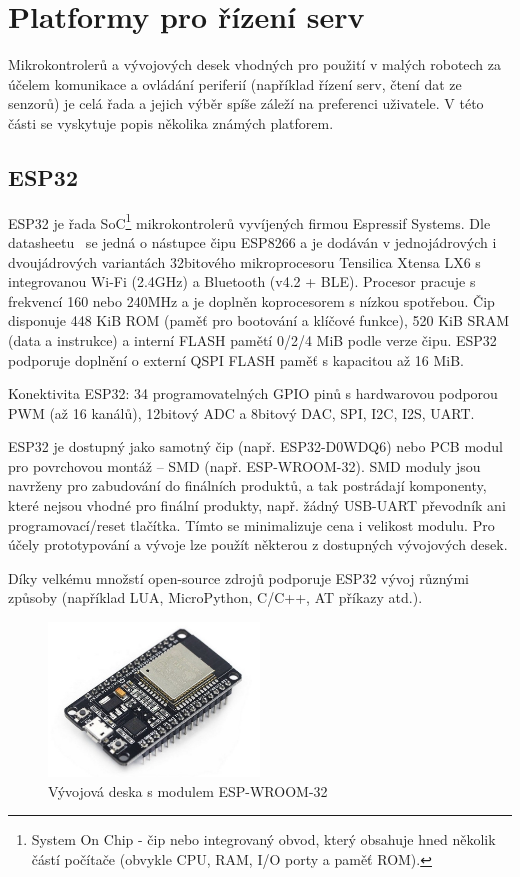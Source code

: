 \section{Platformy pro řízení serv}
Mikrokontrolerů a vývojových desek vhodných pro použití v malých robotech za účelem komunikace a ovládání periferií (například řízení serv, čtení dat ze senzorů) je celá řada a jejich výběr spíše záleží na preferenci uživatele. V této části se vyskytuje popis několika známých platforem.


\subsection*{ESP32}
ESP32 je řada SoC\footnote{System On Chip - čip nebo integrovaný obvod, který obsahuje hned několik částí počítače (obvykle CPU, RAM, I/O porty a paměť ROM)\cite{soc}.} mikrokontrolerů vyvíjených firmou Espressif Systems. Dle datasheetu~\cite{espNet} se jedná o nástupce čipu ESP8266 a je dodáván v jednojádrových i dvoujádrových variantách 32bitového mikroprocesoru Tensilica Xtensa LX6 s integrovanou Wi-Fi (2.4GHz) a Bluetooth (v4.2 + BLE). Procesor pracuje s frekvencí 160 nebo 240MHz a je doplněn koprocesorem s nízkou spotřebou. Čip disponuje 448 KiB ROM (paměť pro bootování a klíčové funkce), 520 KiB SRAM (data a instrukce) a interní FLASH pamětí 0/2/4 MiB podle verze čipu. ESP32 podporuje doplnění o externí QSPI FLASH paměť s kapacitou až 16 MiB.

Konektivita ESP32: 34 programovatelných GPIO pinů s hardwarovou podporou PWM (až 16 kanálů), 12bitový ADC a 8bitový DAC, SPI, I2C, I2S, UART.

ESP32 je dostupný jako samotný čip (např. ESP32-D0WDQ6) nebo PCB modul pro povrchovou montáž -- SMD (např. ESP-WROOM-32). SMD moduly jsou navrženy pro zabudování do finálních produktů, a tak postrádají komponenty, které nejsou vhodné pro finální produkty, např. žádný USB-UART převodník ani programovací/reset tlačítka. Tímto se minimalizuje cena i velikost modulu. Pro účely prototypování a vývoje lze použít některou z dostupných vývojových desek.

Díky velkému množstí open-source zdrojů podporuje ESP32 vývoj různými způsoby (například LUA, MicroPython, C/C++, AT příkazy atd.).

\begin{figure}[hbt]
	\centering
	\includegraphics[width=0.5\textwidth]{obrazky-figures/espdevkit.jpg}
	\caption[esp32board]{Vývojová deska s modulem ESP-WROOM-32\footnotemark}
	\label{esp}
\end{figure}

